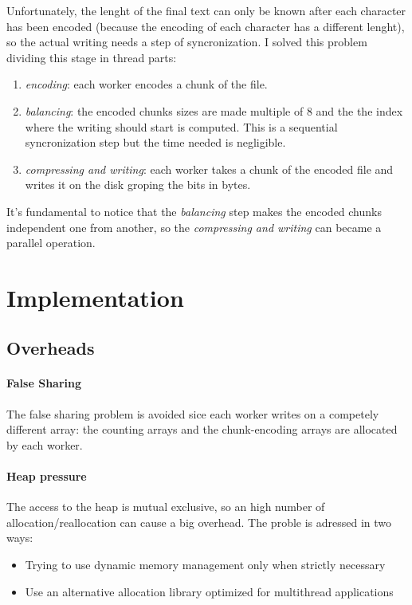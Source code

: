 \documentclass[12pt, letterpaper]{article}
\begin{document}
Unfortunately, the lenght of the final text can only be known after each character has been encoded (because the encoding of each character
has a different lenght), so the actual writing needs a step of syncronization. I solved this problem dividing this stage in thread parts:
\begin{enumerate}
    \item \textit{encoding}: each worker encodes a chunk of the file.
    \item \textit{balancing}: the encoded chunks sizes are made multiple of 8 and the the index where the writing should start is computed. This is a sequential syncronization step but the time needed is negligible.
    \item \textit{compressing and writing}: each worker takes a chunk of the encoded file and writes it on the disk groping the bits in bytes.
\end{enumerate}
It's fundamental to notice that the \textit{balancing} step makes the encoded chunks independent one from another, so the \textit{compressing and writing} can became a parallel operation.


\section{Implementation}

\subsection{Overheads}

\paragraph*{False Sharing}
The false sharing problem is avoided sice each worker writes on a competely different array: the counting arrays
and the chunk-encoding arrays are allocated by each worker.

\paragraph*{Heap pressure}
The access to the heap is mutual exclusive, so an high number of allocation/reallocation can cause a big overhead.
The proble is adressed in two ways:
\begin{itemize}
    \item Trying to use dynamic memory management only when strictly necessary
    \item Use an alternative allocation library optimized for multithread applications
\end{itemize}
\end{document}
